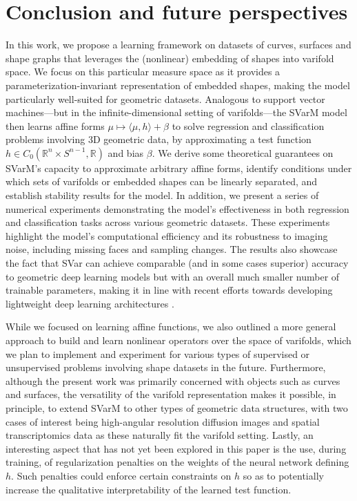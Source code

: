 \documentclass[11pt]{article}
\newcommand{\R}{\mathbb{R}}
\begin{document}
\section{Conclusion and future perspectives}
In this work, we propose a learning framework on datasets of curves, surfaces and shape graphs that leverages the (nonlinear) embedding of shapes into varifold space. We focus on this particular measure space as it provides a parameterization-invariant representation of embedded shapes, making the model particularly well-suited for geometric datasets. Analogous to support vector machines—but in the infinite-dimensional setting of varifolds—the SVarM model then learns affine forms $\mu \mapsto \langle \mu,h\rangle + \beta$ to solve regression and classification problems involving 3D geometric data, by approximating a test function $h\in C_0(\R^n\times S^{n-1},\R)$ and bias $\beta$. We derive some theoretical guarantees on SVarM's capacity to approximate arbitrary affine forms, identify conditions under which sets of varifolds or embedded shapes can be linearly separated, and establish stability results for the model. In addition, we present a series of numerical experiments demonstrating the model’s effectiveness in both regression and classification tasks across various geometric datasets. These experiments highlight the model's computational efficiency and its robustness to imaging noise, including missing faces and sampling changes. The results also showcase the fact that SVar can achieve comparable (and in some cases superior) accuracy to geometric deep learning models but with an overall much smaller number of trainable parameters, making it in line with recent efforts towards developing lightweight deep learning architectures \cite{liu2024lightweight}. 

While we focused on learning affine functions, we also outlined a more general approach to build and learn nonlinear operators over the space of varifolds, which we plan to implement and experiment for various types of supervised or unsupervised problems involving shape datasets in the future. Furthermore, although the present work was primarily concerned with objects such as curves and surfaces, the versatility of the varifold representation makes it possible, in principle, to extend SVarM to other types of geometric data structures, with two cases of interest being high-angular resolution diffusion images \cite{tuch2002high} and spatial transcriptomics data \cite{stouffer2024cross} as these naturally fit the varifold setting. Lastly, an interesting aspect that has not yet been explored in this paper is the use, during training, of regularization penalties on the weights of the neural network defining $h$. Such penalties could enforce certain constraints on $h$ so as to potentially increase the qualitative interpretability of the learned test function. 
\end{document}
